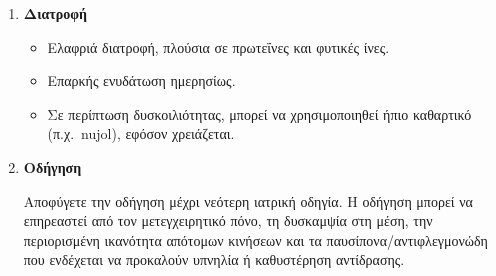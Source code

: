 \documentclass[10pt,greek]{article}
\begin{document}
\begin{enumerate}[label=\arabic*.]
\begin{itemize}
    \end{itemize}
  \item \textbf{Διατροφή}
    \begin{itemize}
\item Ελαφριά διατροφή, πλούσια σε πρωτεΐνες και φυτικές ίνες.
\item Επαρκής ενυδάτωση ημερησίως.
\item Σε περίπτωση δυσκοιλιότητας, μπορεί να χρησιμοποιηθεί ήπιο καθαρτικό (π.χ.\ nujol), εφόσον χρειάζεται.
    \end{itemize}
  \item \textbf{Οδήγηση}

Αποφύγετε την οδήγηση μέχρι νεότερη ιατρική οδηγία. Η οδήγηση μπορεί να επηρεαστεί από τον μετεγχειρητικό πόνο, τη δυσκαμψία στη μέση, την περιορισμένη ικανότητα απότομων κινήσεων και τα παυσίπονα/αντιφλεγμονώδη που ενδέχεται να προκαλούν υπνηλία ή καθυστέρηση αντίδρασης.
\end{enumerate}
\end{document}
